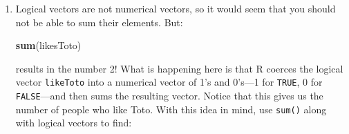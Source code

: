 \documentclass[]{book}
\makeatletter
\newenvironment{Shaded}{\begin{snugshade}}{\end{snugshade}}
\newcommand{\KeywordTok}[1]{\textcolor[rgb]{0.13,0.29,0.53}{\textbf{{#1}}}}
\newcommand{\DecValTok}[1]{\textcolor[rgb]{0.00,0.00,0.81}{{#1}}}
\newcommand{\StringTok}[1]{\textcolor[rgb]{0.31,0.60,0.02}{{#1}}}
\newcommand{\OtherTok}[1]{\textcolor[rgb]{0.56,0.35,0.01}{{#1}}}
\newcommand{\NormalTok}[1]{{#1}}
\providecommand{\tightlist}{%
  \setlength{\itemsep}{0pt}\setlength{\parskip}{0pt}}
\newenvironment{kframe}{%
\medskip{}
\setlength{\fboxsep}{.8em}
 \def\at@end@of@kframe{}%
 \ifinner\ifhmode%
  \def\at@end@of@kframe{\end{minipage}}%
  \begin{minipage}{\columnwidth}%
 \fi\fi%
 \def\FrameCommand##1{\hskip\@totalleftmargin \hskip-\fboxsep
 \colorbox{shadecolor}{##1}\hskip-\fboxsep
     \hskip-\linewidth \hskip-\@totalleftmargin \hskip\columnwidth}%
 \MakeFramed {\advance\hsize-\width
   \@totalleftmargin\z@ \linewidth\hsize
   \@setminipage}}%
 {\par\unskip\endMakeFramed%
 \at@end@of@kframe}
\renewenvironment{Shaded}{\begin{kframe}}{\end{kframe}}
\theoremstyle{definition}
\theoremstyle{definition}
\theoremstyle{remark}
\makeatother
\begin{document}
{\begin{enumerate}
\begin{Shaded}
\begin{Highlighting}[]
\NormalTok{person <-}\StringTok{ }\KeywordTok{c}\NormalTok{(}\StringTok{"Akash"}\NormalTok{, }\StringTok{"Bee"}\NormalTok{, }\StringTok{"Celia"}\NormalTok{, }\StringTok{"Devadatta"}\NormalTok{, }\StringTok{"Enid"}\NormalTok{)}
\NormalTok{age <-}\StringTok{ }\KeywordTok{c}\NormalTok{(}\DecValTok{23}\NormalTok{, }\DecValTok{21}\NormalTok{, }\DecValTok{22}\NormalTok{, }\DecValTok{25}\NormalTok{, }\DecValTok{63}\NormalTok{)}
\NormalTok{height <-}\StringTok{ }\KeywordTok{c}\NormalTok{(}\DecValTok{68}\NormalTok{, }\DecValTok{67}\NormalTok{, }\DecValTok{71}\NormalTok{, }\DecValTok{70}\NormalTok{, }\DecValTok{69}\NormalTok{)}
\NormalTok{likesToto <-}\StringTok{ }\KeywordTok{c}\NormalTok{(}\OtherTok{TRUE}\NormalTok{, }\OtherTok{TRUE}\NormalTok{, }\OtherTok{FALSE}\NormalTok{, }\OtherTok{FALSE}\NormalTok{, }\OtherTok{TRUE}\NormalTok{)}
\end{Highlighting}
\end{Shaded}

  Use sub-setting with logical vectors to produce vectors of:

  \begin{enumerate}
  \def\labelenumii{\arabic{enumii}.}
  \tightlist
  \item
    the names of all people over the age of 22;
  \item
    the names of all people younger than 24 who are also more than 67
    inches tall;
  \item
    the names of all people who either don't like Toto or who are over
    the age of 30;
  \item
    the \emph{number} of people who are over the age of 22.
  \end{enumerate}
\item
  Logical vectors are not numerical vectors, so it would seem that you
  should not be able to sum their elements. But:

\begin{Shaded}
\begin{Highlighting}[]
\KeywordTok{sum}\NormalTok{(likesToto)}
\end{Highlighting}
\end{Shaded}

  results in the number 2! What is happening here is that R coerces the
  logical vector \texttt{likeToto} into a numerical vector of 1's and
  0's---1 for \texttt{TRUE}, 0 for \texttt{FALSE}---and then sums the
  resulting vector. Notice that this gives us the number of people who
  like Toto. With this idea in mind, use \texttt{sum()} along with
  logical vectors to find:


\end{enumerate}}
\end{document}
